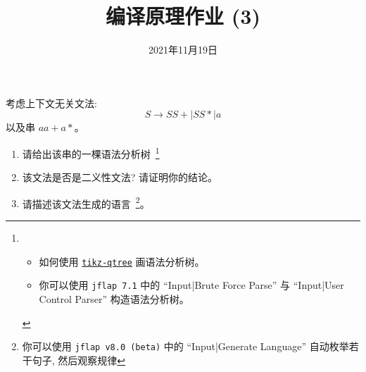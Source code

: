 \documentclass[a4paper, justified]{tufte-handout}
\title{编译原理作业 (3)}
\date{2021年11月19日}
\begin{document}
\maketitle
\noplagiarism %
\begin{abstract}
\end{abstract}
\beginrequired

\begin{problem}[\score{10 = 4 + 4 + 2}]
  考虑上下文无关文法:
  \[
    S \to S S + \mid S S \ast \mid a
  \]
  以及串 $a a + a \ast$。

  \begin{enumerate}[(1)]
    \item 请给出该串的一棵语法分析树~\footnote{
      \begin{itemize}
        \item 如何使用 \href{https://mirrors.hit.edu.cn/CTAN/graphics/pgf/contrib/tikz-qtree/tikz-qtree-manual.pdf}{\texttt{tikz-qtree}} 画语法分析树。
        \item 你可以使用 \texttt{jflap 7.1} 中的 ``Input|Brute Force Parse'' 与 ``Input|User Control Parser'' 构造语法分析树。
      \end{itemize}}
    \item 该文法是否是二义性文法? 请证明你的结论。
    \item 请描述该文法生成的语言~\footnote{你可以使用 \texttt{jflap v8.0 (beta)} 中的 ``Input|Generate Language'' 自动枚举若干句子, 然后观察规律}。
  \end{enumerate}
\end{problem}
\end{document}
